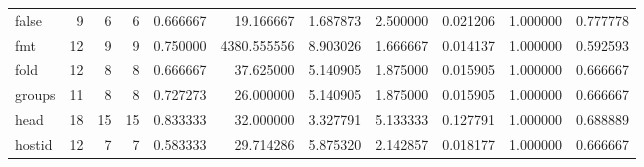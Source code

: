\begin{tabular}{lrrrrrrrrrr}
false     &                                       9 &                  6 &                                 6 &                                   0.666667 &                              19.166667 &                                     1.687873 &                          2.500000 &                                0.021206 &                           1.000000 &                                           0.777778 \\
fmt       &                                      12 &                  9 &                                 9 &                                   0.750000 &                            4380.555556 &                                     8.903026 &                          1.666667 &                                0.014137 &                           1.000000 &                                           0.592593 \\
fold      &                                      12 &                  8 &                                 8 &                                   0.666667 &                              37.625000 &                                     5.140905 &                          1.875000 &                                0.015905 &                           1.000000 &                                           0.666667 \\
groups    &                                      11 &                  8 &                                 8 &                                   0.727273 &                              26.000000 &                                     5.140905 &                          1.875000 &                                0.015905 &                           1.000000 &                                           0.666667 \\
head      &                                      18 &                 15 &                                15 &                                   0.833333 &                              32.000000 &                                     3.327791 &                          5.133333 &                                0.127791 &                           1.000000 &                                           0.688889 \\
hostid    &                                      12 &                  7 &                                 7 &                                   0.583333 &                              29.714286 &                                     5.875320 &                          2.142857 &                                0.018177 &                           1.000000 &                                           0.666667 \\

\end{tabular}

